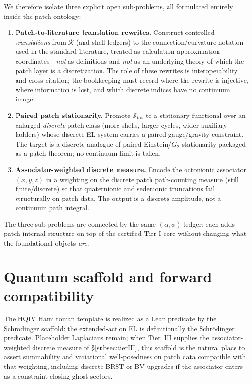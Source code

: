 \documentclass[11pt]{amsart}
\begin{document}
We therefore isolate three explicit open sub-problems, all formulated entirely inside the patch ontology:
\begin{enumerate}
\item \textbf{Patch-to-literature translation rewrites.} Construct controlled \emph{translations} from \(\mathcal{R}\) (and shell ledgers) to the connection/curvature notation used in the standard literature, treated as calculation-approximation coordinates---\emph{not} as definitions and \emph{not} as an underlying theory of which the patch layer is a discretization. The role of these rewrites is interoperability and cross-citation; the bookkeeping must record where the rewrite is injective, where information is lost, and which discrete indices have no continuum image.
\item \textbf{Paired patch stationarity.} Promote \(\mathcal{S}_{\mathrm{tot}}\) to a stationary functional over an enlarged \emph{discrete} patch class (more shells, larger cycles, wider auxiliary ladders) whose discrete EL system carries a paired gauge/gravity constraint. The target is a discrete analogue of paired Einstein/\(G_2\) stationarity packaged as a patch theorem; no continuum limit is taken.
\item \textbf{Associator-weighted discrete measure.} Encode the octonionic associator \((x,y,z)\) in a weighting on the discrete patch path-counting measure (still finite/discrete) so that quaternionic and sedenionic truncations fail structurally on patch data. The output is a discrete amplitude, not a continuum path integral.
\end{enumerate}

The three sub-problems are connected by the same \((\alpha,\phi)\) ledger: each adds patch-internal structure on top of the certified Tier-I core without changing what the foundational objects \emph{are}.

\section{Quantum scaffold and forward compatibility}
\label{sec:quantum}

The HQIV Hamiltonian template is realized as a Lean predicate by the \hyperref[lean:schrodinger]{Schr\"odinger scaffold}: the extended-action EL is definitionally the Schr\"odinger predicate. Placeholder Laplacians remain; when Tier~III supplies the associator-weighted discrete measure of \S\ref{subsec:tierIII}, this scaffold is the natural place to assert summability and variational well-posedness on patch data compatible with that weighting, including discrete BRST or BV upgrades if the associator enters as a constraint closing ghost sectors.
\end{document}
